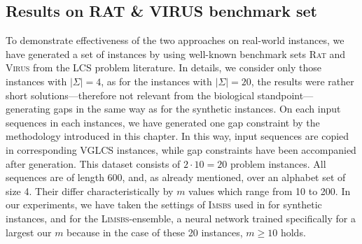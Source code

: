 \documentclass[11pt,a4paper]{article}
\begin{document}
 \subsection{Results on RAT \& VIRUS benchmark set}
 
 To demonstrate effectiveness of the two approaches on real-world instances, we have generated a set of instances by using well-known benchmark sets \textsc{Rat} and \textsc{Virus} from the LCS problem literature. In details, we consider only those instances with $|\Sigma|=4$, as for the instances with $|\Sigma|=20$, the results were rather short solutions---therefore not relevant from the biological standpoint---  generating gaps in the same way as for the synthetic instances.  On each input sequences in each instances, we have generated one gap constraint by the methodology introduced in this chapter. In this way, input sequences are copied in corresponding VGLCS instances, while gap constraints have been accompanied  after generation. This dataset consists of $2\cdot 10=20$ problem instances. All sequences are of length 600, and, as already mentioned, over an alphabet set of size 4. Their differ characteristically by $m$ values which range from 10 to 200. In our experiments, we have taken the settings of \textsc{Imsbs} used in for synthetic instances, and for the \textsc{Limsbs}-ensemble, a neural network trained specifically for a largest our $m$ because in the case of these 20 instances,  $m\geq 10$ holds.
 
 
 
 
\end{document}
